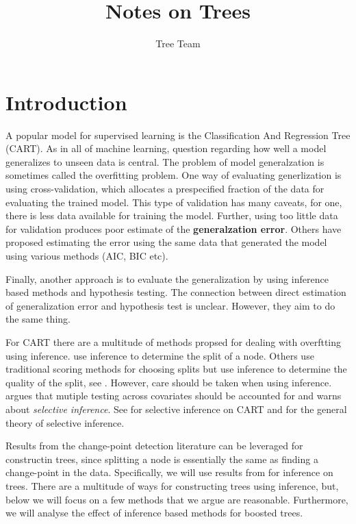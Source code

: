 \documentclass{article}
\title{Notes on Trees} \author{Tree Team}
\theoremstyle{definition} \newtheorem{definition}[theorem]{Definition}
\theoremstyle{remark} \newtheorem{remark}[theorem]{Remark}
\begin{document}
 \maketitle


\section{Introduction} 

A popular model for supervised learning is the Classification And Regression
Tree (CART). As in all of machine learning, question regarding how well a model
generalizes to unseen data is central. The problem of model generalzation is
sometimes called the overfitting problem. One way of evaluating generlization is
using cross-validation, which allocates a prespecified fraction of the data for
evaluating the trained model. This type of validation has many caveats, for one,
there is less data available for training the model. Further, using too little
data for validation produces poor estimate of the \textbf{generalzation error}.
Others have proposed estimating the error using the same data that generated the
model using various methods (AIC, BIC etc). 

Finally, another approach is to evaluate the generalization by using inference
based methods and hypothesis testing. The connection between direct estimation
of generalization error and hypothesis test is unclear. However, they aim to do
the same thing. 

For CART there are a multitude of methods propsed for dealing with overftting
using inference. \cite{shih2004variable} use inference to determine the split of
a node. Others use traditional scoring methods for choosing splits but use
inference to determine the quality of the split, see
\cite{jensen1997adjusting, hothorn2006unbiased, neufeld2022tree}. However, care
should be taken when using inference. \cite{jensen1997adjusting} argues that
mutiple testing across covariates should be accounted for and
\cite{neufeld2022tree} warns about \textit{selective inference}. See
\cite{neufeld2022tree} for selective inference on CART and
\cite{fithian2017optimal} for the general theory of selective inference. 

Results from the change-point detection literature can be leveraged for
constructin trees, since splitting a node is essentially the same as finding a
change-point in the data. Specifically, we will use results from
\cite{hawkins1977testing, yao1986asymptotic} for inference on trees. There are a
multitude of ways for constructing trees using inference, but, below we will
focus on a few methods that we argue are reasonable. Furthermore, we will
analyse the effect of inference based methods for boosted trees. 
\end{document}
